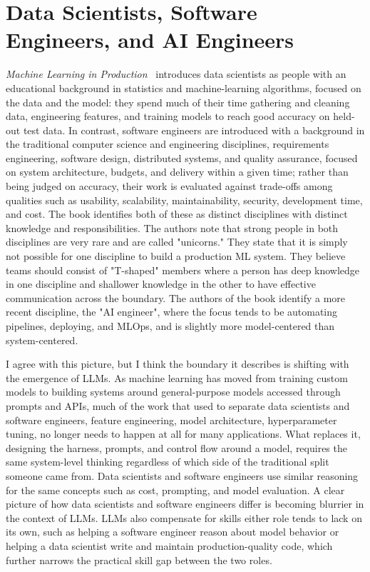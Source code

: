 \documentclass[11pt]{article}
\begin{document}
\section{Data Scientists, Software Engineers, and AI Engineers}

\emph{Machine Learning in Production}~\citep{kastner2025mlip} introduces data scientists as people with an educational background in statistics and machine-learning algorithms, focused on the data and the model: they spend much of their time gathering and cleaning data, engineering features, and training models to reach good accuracy on held-out test data. In contrast, software engineers are introduced with a background in the traditional computer science and engineering disciplines, requirements engineering, software design, distributed systems, and quality assurance, focused on system architecture, budgets, and delivery within a given time; rather than being judged on accuracy, their work is evaluated against trade-offs among qualities such as usability, scalability, maintainability, security, development time, and cost. The book identifies both of these as distinct disciplines with distinct knowledge and responsibilities. The authors note that strong people in both disciplines are very rare and are called "unicorns." They state that it is simply not possible for one discipline to build a production ML system. They believe teams should consist of "T-shaped" members where a person has deep knowledge in one discipline and shallower knowledge in the other to have effective communication across the boundary. The authors of the book identify a more recent discipline, the "AI engineer", where the focus tends to be automating pipelines, deploying, and MLOps, and is slightly more model-centered than system-centered.

I agree with this picture, but I think the boundary it describes is shifting with the emergence of LLMs. As machine learning has moved from training custom models to building systems around general-purpose models accessed through prompts and APIs, much of the work that used to separate data scientists and software engineers, feature engineering, model architecture, hyperparameter tuning, no longer needs to happen at all for many applications. What replaces it, designing the harness, prompts, and control flow around a model, requires the same system-level thinking regardless of which side of the traditional split someone came from. Data scientists and software engineers use similar reasoning for the same concepts such as cost, prompting, and model evaluation. A clear picture of how data scientists and software engineers differ is becoming blurrier in the context of LLMs. LLMs also compensate for skills either role tends to lack on its own, such as helping a software engineer reason about model behavior or helping a data scientist write and maintain production-quality code, which further narrows the practical skill gap between the two roles.
\end{document}
